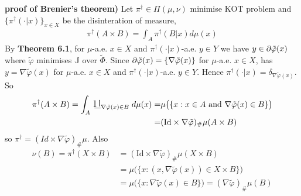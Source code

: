 \documentclass[12pt,a4paper]{article}
\newenvironment{proof}
{\begin{changemargin}{1cm}{0.5cm} 
	}%
	{\end{changemargin}
}
\newenvironment{p}
{\begin{proof} 
	}%
	{\end{proof}
}
\begin{document}
\begin{p}
\textbf{proof of Brenier's theorem)} Let $\pi^{\dagger} \in \Pi(\mu, \nu)$ minimise KOT problem and $\{\pi^{\dagger}(\cdot |x) \}_{x\in X}$ be the disinteration of measure,
\begin{align*}
\pi^{\dagger}(A\times B) = \int_A \pi^{\dagger}(B|x) d\mu(x)
\end{align*}
By \textbf{Theorem 6.1}, for $\mu$-a.e. $x\in X$ and $\pi^{\dagger}(\cdot |x) $-a.e. $y\in Y$ we have $y\in \partial \tilde{\varphi}(x)$ where $\tilde{\varphi}$ minimises $\mathbb{J}$ over $\tilde{\Phi}$. Since $\partial \tilde{\varphi}(x) = \{\nabla \tilde{\varphi}(x)\}$ for $\mu$-a.e. $x\in X$, has $y = \nabla \tilde{\varphi}(x)$ for $\mu$-a.e. $x\in X$ and $\pi^{\dagger}(\cdot|x)$-a.e. $y\in Y$. Hence $\pi^{\dagger}(\cdot | x) = \delta_{\nabla \tilde{\varphi}(x)}$. So
\begin{align*}
\pi^{\dagger}(A\times B) = \int_A  \charac_{\nabla \tilde{\varphi}(x) \in B} d\mu(x) =& \mu \big( \{ x: x\in A \text{ and } \nabla \tilde{\varphi}(x) \in B \}\big) \\
= & ( \text{Id} \times \nabla \tilde{\varphi})_{\#} \mu(A \times B)
\end{align*}
so $\pi^{\dagger} = (Id \times \nabla \tilde{\varphi})_{\#} \mu$. Also
\begin{align*}
\nu(B) = \pi^{\dagger}(X\times B) &= ( \text{Id} \times \nabla \tilde{\varphi})_{\#} \mu(X\times B) \\
&= \mu \big( \{x: (x, \nabla \tilde{\varphi}(x)) \in X\times B  \}\big) \\
&= \mu \big(\{ x: \nabla \tilde{\varphi}(x) \in B \}\big) = (\nabla \tilde{\varphi})_{\#} \mu(B)
\end{align*}


\end{p}
\end{document}
